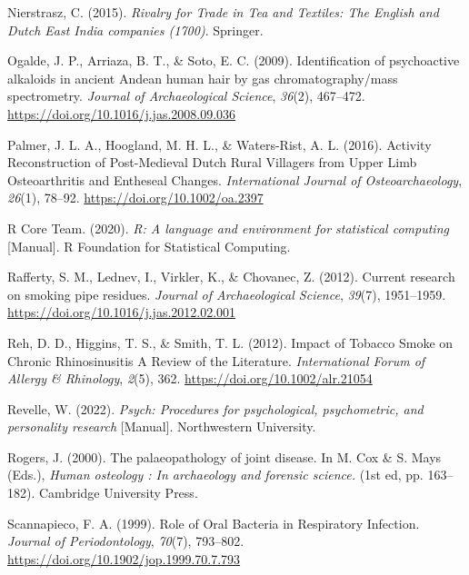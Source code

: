 \documentclass[
  b5paper,
]{book}
\newlength{\cslhangindent}
\newenvironment{CSLReferences}[2] %
 {\begin{list}{}{%
  \setlength{\itemindent}{0pt}
  \setlength{\leftmargin}{0pt}
  \setlength{\parsep}{0pt}
  \ifodd #1
   \setlength{\leftmargin}{\cslhangindent}
   \setlength{\itemindent}{-1\cslhangindent}
  \fi
  \setlength{\itemsep}{#2\baselineskip}}}
 {\end{list}}
\begin{document}
\begin{CSLReferences}{1}{0}
Nierstrasz, C. (2015). \emph{Rivalry for {Trade} in {Tea} and
{Textiles}: {The English} and {Dutch East India} companies
(1700)}. {Springer}.

Ogalde, J. P., Arriaza, B. T., \& Soto, E. C. (2009). Identification of
psychoactive alkaloids in ancient {Andean} human hair by gas
chromatography/mass spectrometry. \emph{Journal of Archaeological
Science}, \emph{36}(2), 467--472.
\url{https://doi.org/10.1016/j.jas.2008.09.036}

Palmer, J. L. A., Hoogland, M. H. L., \& Waters-Rist, A. L. (2016).
Activity {Reconstruction} of {Post}-{Medieval Dutch Rural Villagers}
from {Upper Limb Osteoarthritis} and {Entheseal Changes}.
\emph{International Journal of Osteoarchaeology}, \emph{26}(1), 78--92.
\url{https://doi.org/10.1002/oa.2397}

R Core Team. (2020). \emph{R: {A} language and environment for
statistical computing} {[}Manual{]}. {R Foundation for Statistical
Computing}.

Rafferty, S. M., Lednev, I., Virkler, K., \& Chovanec, Z. (2012).
Current research on smoking pipe residues. \emph{Journal of
Archaeological Science}, \emph{39}(7), 1951--1959.
\url{https://doi.org/10.1016/j.jas.2012.02.001}

Reh, D. D., Higgins, T. S., \& Smith, T. L. (2012). Impact of {Tobacco
Smoke} on {Chronic Rhinosinusitis} \textendash{} {A Review} of the
{Literature}. \emph{International Forum of Allergy \& Rhinology},
\emph{2}(5), 362. \url{https://doi.org/10.1002/alr.21054}

Revelle, W. (2022). \emph{Psych: {Procedures} for psychological,
psychometric, and personality research} {[}Manual{]}. {Northwestern
University}.

Rogers, J. (2000). The palaeopathology of joint disease. In M. Cox \& S.
Mays (Eds.), \emph{Human osteology : {In} archaeology and forensic
science.} (1st ed, pp. 163--182). {Cambridge University Press}.

Scannapieco, F. A. (1999). Role of {Oral Bacteria} in {Respiratory
Infection}. \emph{Journal of Periodontology}, \emph{70}(7), 793--802.
\url{https://doi.org/10.1902/jop.1999.70.7.793}


\end{CSLReferences}
\end{document}
